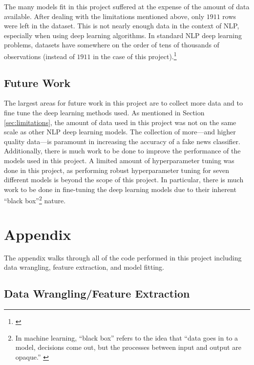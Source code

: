 \documentclass[12pt]{article}
\begin{document}
The many models fit in this project suffered at the expense of the
amount of data available. After dealing with the limitations mentioned
above, only \(1911\) rows were left in the dataset. This is not nearly
enough data in the context of NLP, especially when using deep learning
algorithms. In standard NLP deep learning problems, datasets have
somewhere on the order of tens of thousands of observations (instead of
\(1911\) in the case of this project).\footnote{\citet{HowBuildNeural}}

\hypertarget{future-work}{%
\subsection{Future Work}\label{future-work}}

The largest areas for future work in this project are to collect more
data and to fine tune the deep learning methods used. As mentioned in
Section \ref{sec:limitations}, the amount of data used in this project
was not on the same scale as other NLP deep learning models. The
collection of more---and higher quality data---is paramount in
increasing the accuracy of a fake news classifier. Additionally, there
is much work to be done to improve the performance of the models used in
this project. A limited amount of hyperparameter tuning was done in this
project, as performing robust hyperparameter tuning for seven different
models is beyond the scope of this project. In particular, there is much
work to be done in fine-tuning the deep learning models due to their
inherent ``black box''\footnote{In machine learning, ``black box''
  refers to the idea that ``data goes in to a model, decisions come out,
  but the processes between input and output are opaque.''
  \citet{BlackBox}} nature.

\newpage

\hypertarget{appendix}{%
\section{Appendix}\label{appendix}}

\label{sec:appendix}

The appendix walks through all of the code performed in this project
including data wrangling, feature extraction, and model fitting.

\hypertarget{data-wranglingfeature-extraction}{%
\subsection{Data Wrangling/Feature
Extraction}\label{data-wranglingfeature-extraction}}
\end{document}

